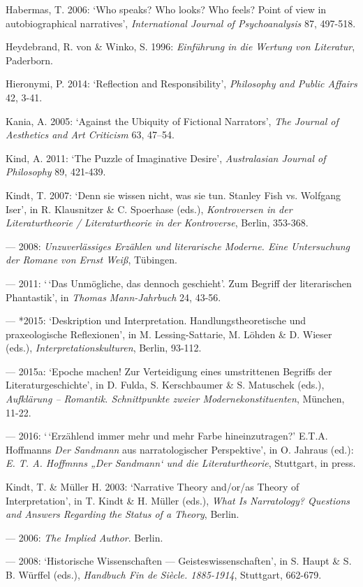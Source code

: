 \begin{hangparas}{.5cm}{1}
Habermas, T. 2006: `Who speaks? Who looks? Who feels? Point of view in autobiographical narratives', \emph{International Journal of Psychoanalysis} 87, 497-518. 

Heydebrand, R. von \& Winko, S. 1996: \emph{Einf\"uhrung in die Wertung von Literatur}, Paderborn.

Hieronymi, P. 2014: `Reflection and Responsibility', \emph{Philosophy and Public Affairs} 42, 3-41.

Kania, A. 2005: `Against the Ubiquity of Fictional Narrators', \emph{The Journal of Aesthetics and Art Criticism} 63, 47--54.

Kind, A. 2011: `The Puzzle of Imaginative Desire', \emph{Australasian Journal of Philosophy} 89, 421-439.

Kindt, T. 2007: `Denn sie wissen nicht, was sie tun. Stanley Fish vs. Wolfgang Iser', in R. Klausnitzer \& C. Spoerhase (eds.), \emph{Kontroversen in der Literaturtheorie / Literaturtheorie in der Kontroverse}, Berlin, 353-368.

--- 2008: \emph{Unzuverl\"assiges Erz\"ahlen und literarische Moderne. Eine Untersuchung der Romane von Ernst Wei{\ss}}, T\"ubingen. 

--- 2011: `\,`Das Unm\"ogliche, das dennoch geschieht'. Zum Begriff der literarischen Phantastik', in \emph{Thomas Mann-Jahrbuch} 24, 43-56.

--- *2015: `Deskription und Interpretation. Handlungstheoretische und praxeologische Reflexionen', in M. Lessing-Sattarie, M. L\"ohden \& D. Wieser (eds.), \emph{Interpretationskulturen}, Berlin, 93-112.

--- 2015a: `Epoche machen! Zur Verteidigung eines umstrittenen Begriffs der Literaturgeschichte', in D. Fulda, S. Kerschbaumer \& S. Matuschek (eds.), \emph{Aufkl\"arung -- Romantik. Schnittpunkte zweier Modernekonstituenten}, M\"unchen, 11-22.

--- 2016: `\,`Erz\"ahlend immer mehr und mehr Farbe hineinzutragen?' E.T.A. Hoffmanns \emph{Der Sandmann} aus narratologischer Perspektive', in O. Jahraus (ed.): \emph{E. T. A. Hoffmnns „Der Sandmann` und die Literaturtheorie}, Stuttgart, in press.

Kindt, T. \& M\"uller H. 2003: `Narrative Theory and/or/as Theory of Interpretation', in T. Kindt \& H. M\"uller (eds.), \emph{What Is Narratology? Questions and Answers Regarding the Status of a Theory}, Berlin.

--- 2006: \emph{The Implied Author}. Berlin.

--- 2008: `Historische Wissenschaften --- Geisteswissenschaften', in S. Haupt \& S. B. W\"urffel (eds.), \emph{Handbuch Fin de Si\`ecle. 1885-1914}, Stuttgart, 662-679.


\end{hangparas}
